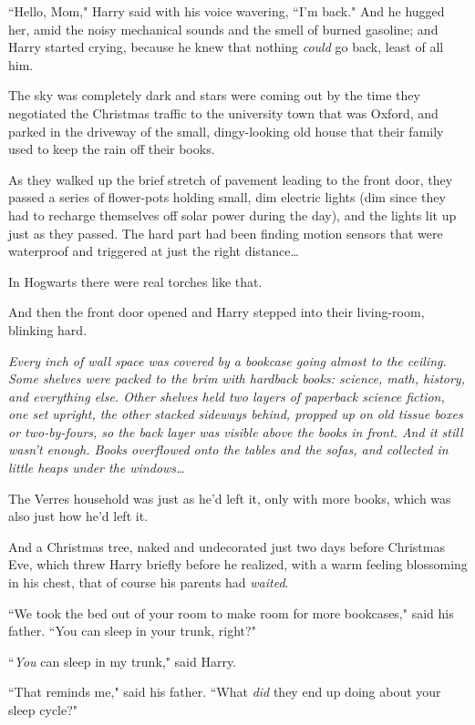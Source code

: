 ``Hello, Mom," Harry said with his voice wavering, ``I'm back." And he hugged her, amid the noisy mechanical sounds and the smell of burned gasoline; and Harry started crying, because he knew that nothing \emph{could} go back, least of all him.

\later

The sky was completely dark and stars were coming out by the time they negotiated the Christmas traffic to the university town that was Oxford, and parked in the driveway of the small, dingy-looking old house that their family used to keep the rain off their books.

As they walked up the brief stretch of pavement leading to the front door, they passed a series of flower-pots holding small, dim electric lights (dim since they had to recharge themselves off solar power during the day), and the lights lit up just as they passed. The hard part had been finding motion sensors that were waterproof and triggered at just the right distance{\ldots}

In Hogwarts there were real torches like that.

And then the front door opened and Harry stepped into their living-room, blinking hard.

\emph{Every inch of wall space was covered by a bookcase going almost to the ceiling. Some shelves were packed to the brim with hardback books: science, math, history, and everything else. Other shelves held two layers of paperback science fiction, one set upright, the other stacked sideways behind, propped up on old tissue boxes or two-by-fours, so the back layer was visible above the books in front. And it still wasn't enough. Books overflowed onto the tables and the sofas, and collected in little heaps under the windows{\ldots}}

The Verres household was just as he'd left it, only with more books, which was also just how he'd left it.

And a Christmas tree, naked and undecorated just two days before Christmas Eve, which threw Harry briefly before he realized, with a warm feeling blossoming in his chest, that of course his parents had \emph{waited}.

``We took the bed out of your room to make room for more bookcases," said his father. ``You can sleep in your trunk, right?"

``\emph{You} can sleep in my trunk," said Harry.

``That reminds me," said his father. ``What \emph{did} they end up doing about your sleep cycle?"

